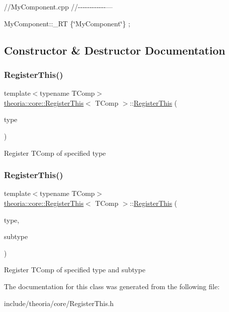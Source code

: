 //\+My\+Component.cpp //-\/-\/-\/-\/-\/-\/-\/-\/-\/-\/-\/-\/---

My\+Component\+::\+\_\+\+RT \{\char`\"{}\+My\+Component\char`\"{}\} ; 

\subsection{Constructor \& Destructor Documentation}
\mbox{\label{classtheoria_1_1core_1_1RegisterThis_ad736eff7aa2b6819197a839a08382f20}} 
\subsubsection{\texorpdfstring{Register\+This()}{RegisterThis()}\hspace{0.1cm}{\footnotesize\ttfamily [1/2]}}
{\footnotesize\ttfamily template$<$typename T\+Comp$>$ \\
\hyperlink{classtheoria_1_1core_1_1RegisterThis}{theoria\+::core\+::\+Register\+This}$<$ T\+Comp $>$\+::\hyperlink{classtheoria_1_1core_1_1RegisterThis}{Register\+This} (\begin{DoxyParamCaption}\item[{const Type\+Name \&}]{type }\end{DoxyParamCaption})\hspace{0.3cm}{\ttfamily [inline]}}

Register T\+Comp of specified type \mbox{\label{classtheoria_1_1core_1_1RegisterThis_aec0af7608af32e2b828c7e3953af3695}} 
\subsubsection{\texorpdfstring{Register\+This()}{RegisterThis()}\hspace{0.1cm}{\footnotesize\ttfamily [2/2]}}
{\footnotesize\ttfamily template$<$typename T\+Comp$>$ \\
\hyperlink{classtheoria_1_1core_1_1RegisterThis}{theoria\+::core\+::\+Register\+This}$<$ T\+Comp $>$\+::\hyperlink{classtheoria_1_1core_1_1RegisterThis}{Register\+This} (\begin{DoxyParamCaption}\item[{const Type\+Name \&}]{type,  }\item[{const Sub\+Type\+Name \&}]{subtype }\end{DoxyParamCaption})\hspace{0.3cm}{\ttfamily [inline]}}

Register T\+Comp of specified type and subtype 

The documentation for this class was generated from the following file\+:\begin{DoxyCompactItemize}
\item 
include/theoria/core/Register\+This.\+h\end{DoxyCompactItemize}
